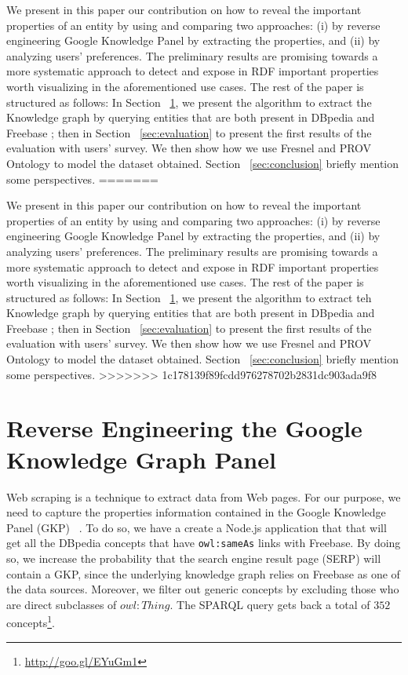 \documentclass[runningheads,a4paper]{llncs}
\begin{document}
  We present in this paper our contribution on how to reveal the important properties of an entity by using and comparing two approaches: (i) by reverse engineering Google Knowledge Panel by extracting the properties, and (ii) by analyzing users' preferences. The preliminary results are promising towards a more systematic approach to detect and expose in RDF important properties worth visualizing in the aforementioned use cases. 
  The rest of the paper is structured as follows: In Section ~\ref{sec:knowledge-graph}, we present the algorithm to extract the Knowledge graph by querying entities that are both present in DBpedia and Freebase ; then in Section ~\ref{sec:evaluation} to present the first results of the evaluation with users' survey. We then show how we use Fresnel and PROV Ontology to model the dataset obtained. Section ~\ref{sec:conclusion} briefly mention some perspectives.
=======

We present in this paper our contribution on how to reveal the important properties of an entity by using and comparing two approaches: (i) by reverse engineering Google Knowledge Panel by extracting the properties, and (ii) by analyzing users' preferences. The preliminary results are promising towards a more systematic approach to detect and expose in RDF important properties worth visualizing in the aforementioned use cases. The rest of the paper is structured as follows: In Section ~\ref{sec:knowledge-graph}, we present the algorithm to extract teh Knowledge graph by querying entities that are both present in DBpedia and Freebase ; then in Section ~\ref{sec:evaluation} to present the first results of the evaluation with users' survey. We then show how we use Fresnel and PROV Ontology to model the dataset obtained. Section ~\ref{sec:conclusion} briefly mention some perspectives.
>>>>>>> 1c178139f89fcdd976278702b2831dc903ada9f8

\section{Reverse Engineering the Google Knowledge Graph Panel}
\label{sec:knowledge-graph}

Web scraping is a technique to extract data from Web pages. For our purpose, we need to capture the properties information contained in the Google Knowledge Panel (GKP) ~\cite{Bergman2012}. To do so, we have a create a Node.js application that that will get all the DBpedia concepts that have \texttt{owl:sameAs} links with Freebase. By doing so, we increase the probability that the search engine result page (SERP) will contain a GKP, since the underlying knowledge graph relies on Freebase as one of the data sources. Moreover, we filter out generic concepts by excluding those who are direct subclasses of $owl:Thing$. The SPARQL query gets back a total of $352$ concepts\footnote{\url{http://goo.gl/EYuGm1}}.
\end{document}
